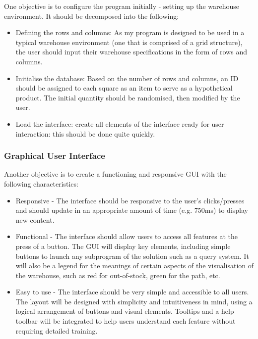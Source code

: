 One objective is to configure the program initially - setting up the warehouse environment. It should be decomposed into the following:

\begin{itemize}
    \item Defining the rows and columns: As my program is designed to be used in a typical warehouse environment (one that is comprised of a grid structure), the user should input their warehouse specifications in the form of rows and columns.

    \item Initialise the database: Based on the number of rows and columns, an ID should be assigned to each square as an item to serve as a hypothetical product. The initial quantity should be randomised, then modified by the user.

    \item Load the interface: create all elements of the interface ready for user interaction: this should be done quite quickly.

\end{itemize} 

\subsubsection{Graphical User Interface}

Another objective is to create a functioning and responsive GUI with the following characteristics:

\begin{itemize}
    \item Responsive - The interface should be responsive to the user's clicks/presses and should update in an appropriate amount of time (e.g. 750ms) to display new content.

    \item Functional - The interface should allow users to access all features at the press of a button. The GUI will display key elements, including simple buttons to launch any subprogram of the solution such as a query system. It will also be a legend for the meanings of certain aspects of the visualisation of the warehouse, such as red for out-of-stock, green for the path, etc.

    \item Easy to use - The interface should be very simple and accessible to all users. The layout will be designed with simplicity and intuitiveness in mind, using a logical arrangement of buttons and visual elements. Tooltips and a help toolbar will be integrated to help users understand each feature without requiring detailed training.


\end{itemize}

